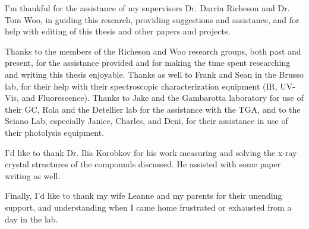 I'm thankful for the assistance of my supervisors Dr. Darrin Richeson and Dr. Tom Woo, in guiding this research, providing suggestions and assistance, and for help with editing of this thesis and other papers and projects.

Thanks to the members of the Richeson and Woo research groups, both past and present, for the assistance provided and for making the time spent researching and writing this thesis enjoyable. Thanks as well to Frank and Sean in the Brusso lab, for their help with their spectroscopic characterization equipment (IR, UV-Vis, and Fluorescence). Thanks to Jake and the Gambarotta laboratory for use of their GC, Rola and the Detellier lab for the assistance with the TGA, and to the Sciano Lab, especially Janice, Charles, and Deni, for their assistance in use of their photolysis equipment. 

I'd like to thank Dr. Ilia Korobkov for his work measuring and solving the x-ray crystal structures of the compounds discussed. He assisted with some paper writing as well. 

Finally, I'd like to thank my wife Leanne and my parents for their unending support, and understanding when I came home frustrated or exhausted from a day in the lab.